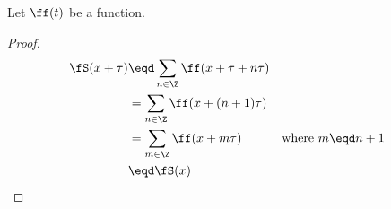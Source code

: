 \begin{lemma}
\label{lem:series_sumT}
Let $\ff(t)$ be a function.
\end{lemma}
\begin{proof}
\begin{align*}
  \fS(x+\tau)
    &\eqd \sum_{n\in\Z} \ff(x+\tau+n\tau)
  \\&=    \sum_{n\in\Z} \ff(x+(n+1)\tau)
  \\&=    \sum_{m\in\Z} \ff(x+m\tau)
    &&    \text{where $m\eqd n+1$}
  \\&\eqd \fS(x)
\end{align*}
\end{proof}



